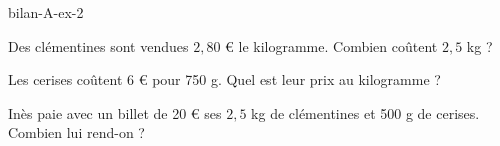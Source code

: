 \begin{blocEdition}{bilan-A-ex-2}
\begin{questions}
\item Des clémentines sont vendues $2{,}80$ € le kilogramme. Combien coûtent $2{,}5$ kg ?
\item Les cerises coûtent 6 € pour 750 g. Quel est leur prix au kilogramme ?
\item Inès paie avec un billet de 20 € ses $2{,}5$ kg de clémentines et 500 g de cerises. Combien lui rend-on ?
\end{questions}\par{}\par\par{}\par{}\par{}\par{}\par{}\par{}
\end{blocEdition}

